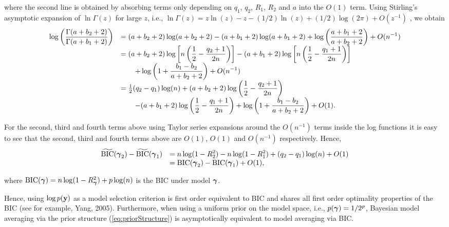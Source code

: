 \documentclass{article}[12pt]
\begin{document}
\noindent where the second line is obtained by absorbing terms only depending on $q_1$, $q_2$, $R_1$, $R_2$ and $a$ into 
the $O(1)$ term. Using Stirling's asymptotic expansion
of $\ln\Gamma(z)$ for large
$z$, i.e.,
$\ln \Gamma (z) = z\ln(z)-z -(1/2)\ln(z) + (1/2)\log(2\pi) + O(z^{-1})$ \citep[see for example Equation 6.1.37 of][]{Abramowitz1972},
we obtain  
$$
\begin{array}{rl}
\displaystyle \log\left( \frac{\Gamma(a + b_2 + 2)}{\Gamma(a + b_1 + 2)} \right)
& \displaystyle = (a + b_2 + 2)\log(a + b_2 + 2) - (a + b_1 + 2)\log(a + b_1 + 2)
+ \log\left( \frac{a + b_1 + 2}{a + b_2 + 2} \right) + O(n^{-1})
\\
& \displaystyle = (a + b_2 + 2)\log\left[ n \left( \frac{1}{2} - \frac{q_2 + 1}{2n}  \right) \right] - (a + b_1 + 2)\log\left[ n \left( \frac{1}{2} - \frac{q_1 + 1}{2n}  \right) \right] \\
& \displaystyle \qquad 
+ \log\left( 1 +  \frac{b_1 - b_2}{a + b_2 + 2} \right) + O(n^{-1})
\\
& \displaystyle = \tfrac{1}{2} (q_2 - q_1)\log(n) 
+ (a + b_2 + 2)\log\left( \frac{1}{2} - \frac{q_2 + 1}{2n}  \right)
\\
& \displaystyle \qquad 
- (a + b_1 + 2)\log\left( \frac{1}{2} - \frac{q_1 + 1}{2n}  \right)
+ \log\left( 1 +  \frac{b_1 - b_2}{a + b_2 + 2} \right) + O(1).
\end{array} 
$$

\noindent For the second, third and fourth terms above
using Taylor series expansions around the $O(n^{-1})$ terms inside
the log functions it is easy to see that the 
second, third and fourth terms above are $O(1)$, $O(1)$ and $O(n^{-1})$
respectively. Hence,
$$
\begin{array}{rl}
\widetilde{\mbox{BIC}}({\boldsymbol \gamma}_2) - \widetilde{\mbox{BIC}}({\boldsymbol \gamma}_1)
& \displaystyle = n\log(1 - R_2^2) - n\log(1 - R_1^2) +  (q_2 - q_1)\log(n)   + O(1)
\\
& \displaystyle = \mbox{BIC}({\boldsymbol \gamma}_2) - \mbox{BIC}({\boldsymbol \gamma}_1) + O(1),
\end{array} 
$$

\noindent where $\mbox{BIC}({\boldsymbol \gamma}) = n\log(1 - R_{\boldsymbol \gamma}^2)  + p\log(n)$ is
the BIC under model ${\boldsymbol \gamma}$.

Hence, using $\log p({\bf y})$ as a model selection criterion is
first order equivalent to BIC and shares all first order optimality properties
of the BIC (see for example, Yang, 2005). Furthermore, when using a uniform
prior on the model space, i.e., $p({\boldsymbol \gamma}) = 1/2^p$, Bayesian model averaging 
via the prior structure (\ref{eq:priorStructure}) is asymptotically equivalent
to model averaging via BIC.
\end{document}
